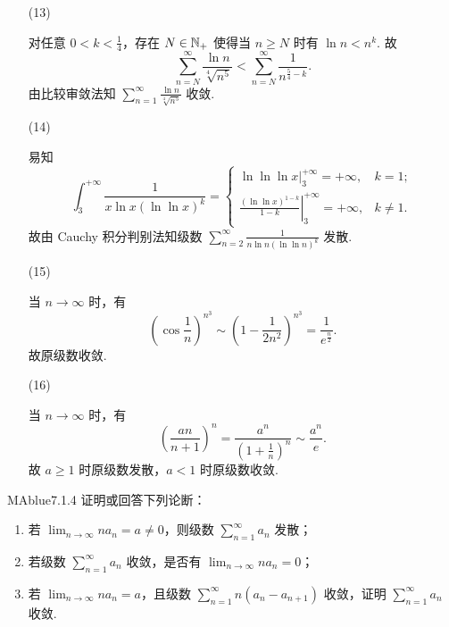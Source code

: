\begin{enumerate}
    \item[(13)]
    \begin{solution}
        对任意 $0 < k < \frac 1 4$，存在 $N \in \mathbb N_+$ 使得当 $n \geqslant N$ 时有 $\ln n < n^k$. 故
        \[
            \sum_{n=N}^{\infty} \frac{\ln n}{\sqrt[4]{n^5}} < \sum_{n=N}^{\infty} \frac 1 {n^{\frac 5 4 - k}}.
        \]
        由比较审敛法知 $\sum_{n=1}^{\infty} \frac{\ln n}{\sqrt[4]{n^5}}$ 收敛.
    \end{solution}
    \item[(14)]
    \begin{solution}
        易知
        \[
            \int_3^{+\infty} \frac 1 {x \ln x (\ln \ln x)^k} = \begin{cases}
                \left. \ln \ln \ln x \right|_3^{+\infty} = +\infty, & k = 1; \\
                \left. \frac{(\ln \ln x)^{1-k}}{1-k} \right|_3^{+\infty} = +\infty, & k \neq 1.
            \end{cases}
        \]
        故由 Cauchy 积分判别法知级数 $\sum_{n=2}^{\infty} \frac 1 {n \ln n (\ln \ln n)^k}$ 发散.
    \end{solution}
    \item[(15)]
    \begin{solution}
        当 $n \to \infty$ 时，有
        \[
            \left( \cos \frac 1 n \right)^{n^3} \sim \left( 1 - \frac 1 {2n^2} \right)^{n^3} = \frac 1 {e^{\frac n 2}}.
        \]
        故原级数收敛.
    \end{solution}
    \item[(16)]
    \begin{solution}
        当 $n \to \infty$ 时，有
        \[
            \left( \frac{an}{n+1} \right)^n = \frac{a^n}{\left( 1 + \frac 1 n \right)^n} \sim \frac {a^n} e.
        \]
        故 $a \geqslant 1$ 时原级数发散，$a < 1$ 时原级数收敛.
    \end{solution}
\end{enumerate}

\begin{problem}{MAblue}{7.1.4}
    证明或回答下列论断：
    \begin{enumerate}[label={(\arabic*)}]
        \item 若 $\lim_{n \to \infty} na_n = a \neq 0$，则级数 $\sum_{n=1}^\infty a_n$ 发散；
        \item 若级数 $\sum_{n=1}^\infty a_n$ 收敛，是否有 $\lim_{n \to \infty} na_n = 0$；
        \item 若 $\lim_{n \to \infty} na_n = a$，且级数 $\sum_{n=1}^\infty n(a_n-a_{n+1})$ 收敛，证明 $\sum_{n=1}^\infty a_n$ 收敛.
    \end{enumerate}
\end{problem}

